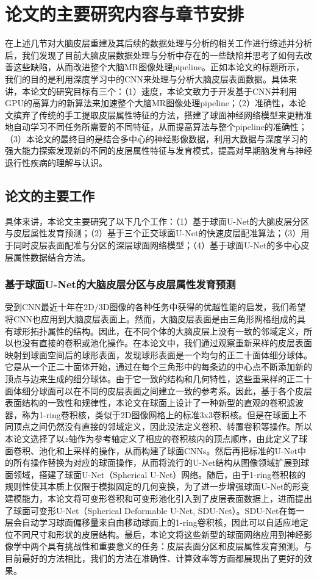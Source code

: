 \section{论文的主要研究内容与章节安排}
在上述几节对大脑皮层重建及其后续的数据处理与分析的相关工作进行综述并分析后，我们发现了目前大脑皮层数据处理与分析中存在的一些缺陷并思考了如何去改善这些缺陷，从而改进整个大脑MR图像处理pipeline。正如本论文的标题所示，我们的目的是利用深度学习中的CNN来处理与分析大脑皮层表面数据。具体来讲，本论文的研究目标有三个：（1）速度，本论文致力于开发基于CNN并利用GPU的高算力的新算法来加速整个大脑MR图像处理pipeline；（2）准确性，本论文摈弃了传统的手工提取皮层属性特征的方法，搭建了球面神经网络模型来更精准地自动学习不同任务所需要的不同特征，从而提高算法与整个pipeline的准确性；（3）本论文的最终目的是结合多中心的神经影像数据，利用大数据与深度学习的强大能力探索发现新的不同的皮层属性特征与发育模式，提高对早期脑发育与神经退行性疾病的理解与认识。

\subsection{论文的主要工作}
具体来讲，本论文主要研究了以下几个工作：（1）基于球面U-Net的大脑皮层分区与皮层属性发育预测；（2）基于三个正交球面U-Net的快速皮层配准算法；（3）用于同时皮层表面配准与分区的深层球面网络模型；（4）基于球面U-Net的多中心皮层属性数据结合方法。

\subsubsection{基于球面U-Net的大脑皮层分区与皮层属性发育预测}
受到CNN最近十年在2D/3D图像的各种任务中获得的优越性能的启发，我们希望将CNN也应用到大脑皮层表面上。然而，大脑皮层表面是由三角形网格组成的具有球形拓扑属性的结构。因此，在不同个体的大脑皮层上没有一致的邻域定义，所以也没有直接的卷积或池化操作。在本论文中，我们通过观察重新采样的皮层表面映射到球面空间后的球形表面，发现球形表面是一个均匀的正二十面体细分球体。它是从一个正二十面体开始，通过在每个三角形中的每条边的中心点不断添加新的顶点与边来生成的细分球体。由于它一致的结构和几何特性，这些重采样的正二十面体细分球面可以在不同的皮层表面之间建立一致的参考系。因此，基于各个皮层表面结构的一致性和规律性，本论文在球面上设计了一种新型的直观的卷积滤波器，称为1-ring卷积核，类似于2D图像网格上的标准3x3卷积核。但是在球面上不同顶点之间仍然没有直接的邻域定义，因此没法定义卷积、转置卷积等操作。所以本论文选择了以$z$轴作为参考轴定义了相应的卷积核内的顶点顺序，由此定义了球面卷积、池化和上采样的操作，从而构建了球面CNNs。然后再把标准的U-Net\cite{ronneberger2015u}中的所有操作替换为对应的球面操作，从而将流行的U-Net结构从图像领域扩展到球面领域，搭建了球面U-Net（Spherical U-Net）网络。随后，由于1-ring卷积核的规则性使其本质上仅限于模拟固定的几何变换，为了进一步增强球面U-Net的形变建模能力，本论文将可变形卷积和可变形池化引入到了皮层表面数据上，进而提出了球面可变形U-Net（Spherical Deformable U-Net, SDU-Net）。SDU-Net在每一层会自动学习球面偏移量来自由移动球面上的1-ring卷积核，因此可以自适应地定位不同尺寸和形状的皮层结构。最后，本论文将这些新型的球面网络应用到神经影像学中两个具有挑战性和重要意义的任务：皮层表面分区和皮层属性发育预测。与目前最好的方法相比，我们的方法在准确性、计算效率等方面都展现出了更好的效果。

